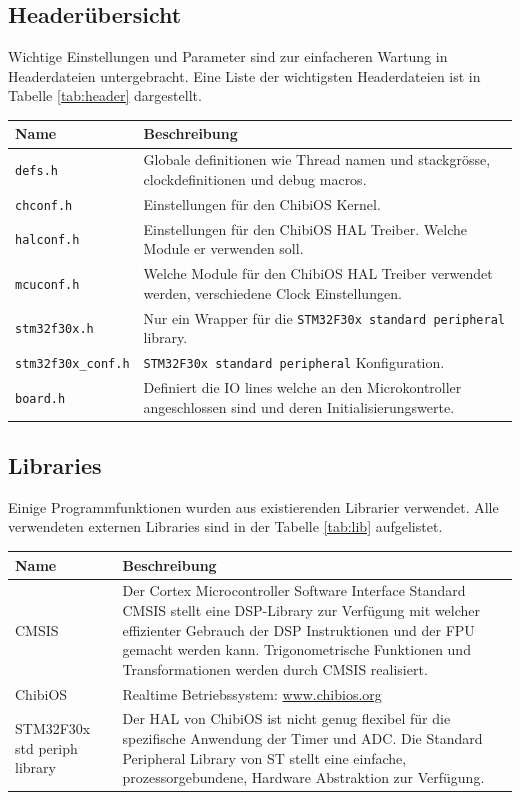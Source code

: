 \subsection*{Headerübersicht}
Wichtige Einstellungen und Parameter sind zur einfacheren Wartung in Headerdateien untergebracht. Eine Liste der wichtigsten Headerdateien ist in Tabelle \ref{tab:header} dargestellt.\\
\begin{tabularx}{\textwidth}{l|X}
	Name & Beschreibung \\ \hline
	\texttt{defs.h} & Globale definitionen wie Thread namen und stackgrösse, clockdefinitionen und debug macros. \\ \hline
	\texttt{chconf.h} & Einstellungen für den ChibiOS Kernel. \\ \hline
	\texttt{halconf.h} & Einstellungen für den ChibiOS HAL Treiber. Welche Module er verwenden soll. \\ \hline
	\texttt{mcuconf.h} & Welche Module für den ChibiOS HAL Treiber verwendet werden, verschiedene Clock Einstellungen. \\ \hline
	\texttt{stm32f30x.h} & Nur ein Wrapper für die \texttt{STM32F30x standard peripheral} library. \\ \hline
	\texttt{stm32f30x\_conf.h} & \texttt{STM32F30x standard peripheral} Konfiguration. \\ \hline
	\texttt{board.h} & Definiert die IO lines welche an den Microkontroller angeschlossen sind und deren Initialisierungswerte. \\ \hline
\end{tabularx}
\label{tab:header}

\subsection*{Libraries}
Einige Programmfunktionen wurden aus existierenden Librarier verwendet. Alle verwendeten externen Libraries sind in der Tabelle \ref{tab:lib} aufgelistet.\\
\begin{tabularx}{\textwidth}{l|X}
	Name & Beschreibung \\ \hline
	CMSIS &  Der Cortex Microcontroller Software Interface Standard CMSIS stellt eine DSP-Library zur Verfügung mit welcher effizienter Gebrauch der DSP Instruktionen und der FPU gemacht werden kann. Trigonometrische Funktionen und Transformationen werden durch CMSIS realisiert. \\ \hline
	ChibiOS & Realtime Betriebssystem: \url{www.chibios.org} \\ \hline
	STM32F30x std periph library & Der HAL von ChibiOS ist nicht genug flexibel für die spezifische Anwendung der Timer und ADC. Die Standard Peripheral Library von ST stellt eine einfache, prozessorgebundene, Hardware Abstraktion zur Verfügung.  \\ \hline
\end{tabularx}
\label{tab:lib}


